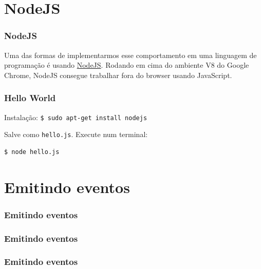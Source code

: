 \section{NodeJS}

\begin{frame}\frametitle{NodeJS}

Uma das formas de implementarmos esse comportamento em uma linguagem de
programação é usando \href{http://nodejs.org/}{NodeJS}. Rodando em cima
do ambiente V8 do Google Chrome, NodeJS consegue trabalhar fora do
browser usando JavaScript.

\end{frame}

\begin{frame}[fragile]\frametitle{Hello World}

Instalação: \texttt{\$ sudo apt-get install nodejs}


Salve como \texttt{hello.js}. Execute num terminal:

\begin{verbatim}
$ node hello.js
\end{verbatim}
\end{frame}

\section{Emitindo eventos}

\begin{frame}\frametitle{Emitindo eventos}


\end{frame}

\begin{frame}\frametitle{Emitindo eventos}


\end{frame}

\begin{frame}\frametitle{Emitindo eventos}


\end{frame}


